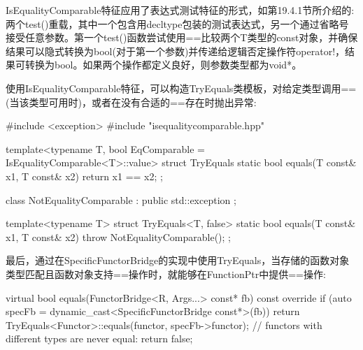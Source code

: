 IsEqualityComparable特征应用了表达式测试特征的形式，如第19.4.1节所介绍的:两个test()重载，其中一个包含用decltype包装的测试表达式，另一个通过省略号接受任意参数。第一个test()函数尝试使用==比较两个T类型的const对象，并确保结果可以隐式转换为bool(对于第一个参数)并传递给逻辑否定操作符operator!，结果可转换为bool。如果两个操作都定义良好，则参数类型都为void*。

使用IsEqualityComparable特征，可以构造TryEquals类模板，对给定类型调用==(当该类型可用时)，或者在没有合适的==存在时抛出异常:

\begin{cpp}
#include <exception>
#include "isequalitycomparable.hpp"

template<typename T,
bool EqComparable = IsEqualityComparable<T>::value>
struct TryEquals
{
	static bool equals(T const& x1, T const& x2) {
		return x1 == x2;
	}
};

class NotEqualityComparable : public std::exception
{
};

template<typename T>
struct TryEquals<T, false>
{
	static bool equals(T const& x1, T const& x2) {
		throw NotEqualityComparable();
	}
};
\end{cpp}

最后，通过在SpecificFunctorBridge的实现中使用TryEquals，当存储的函数对象类型匹配且函数对象支持==操作时，就能够在FunctionPtr中提供==操作:

\begin{cpp}
virtual bool equals(FunctorBridge<R, Args...> const* fb) const override {
	if (auto specFb = dynamic_cast<SpecificFunctorBridge const*>(fb)) {
		return TryEquals<Functor>::equals(functor, specFb->functor);
	}
	// functors with different types are never equal:
	return false;
}
\end{cpp}




























